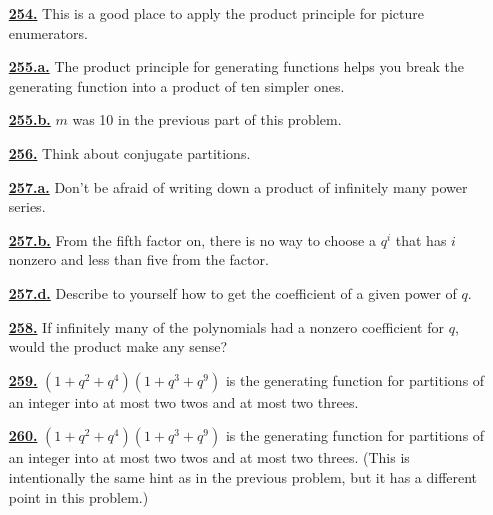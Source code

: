 \documentclass[10pt,]{book}
\theoremstyle{plain}
\theoremstyle{definition}
\theoremstyle{definition}
\theoremstyle{definition}
\numberwithin{equation}{chapter}
\begin{document}
\begin{itemize}[itemsep=1em]
\hypertarget{a-254}{}\item[\textbf{\hyperref[change-making]{254.}}]
\hypertarget{p-1154}{}%
This is a good place to apply the product principle for picture enumerators.%

\hypertarget{a-255.a}{}\item[\textbf{\hyperref[task-200]{255.a.}}]
\hypertarget{p-1160}{}%
The product principle for generating functions helps you break the generating function into a product of ten simpler ones.%

\hypertarget{a-255.b}{}\item[\textbf{\hyperref[largestpartatmostm]{255.b.}}]
\hypertarget{p-1163}{}%
\(m\) was 10 in the previous part of this problem.%

\hypertarget{a-256}{}\item[\textbf{\hyperref[atmostmparts]{256.}}]
\hypertarget{p-1166}{}%
Think about conjugate partitions.%

\hypertarget{a-257.a}{}\item[\textbf{\hyperref[task-202]{257.a.}}]
\hypertarget{p-1170}{}%
Don't be afraid of writing down a product of infinitely many power series.%

\hypertarget{a-257.b}{}\item[\textbf{\hyperref[task-203]{257.b.}}]
\hypertarget{p-1173}{}%
From the fifth factor on, there is no way to choose a \(q^i\) that has \(i\) nonzero and less than five from the factor.%

\hypertarget{a-257.d}{}\item[\textbf{\hyperref[task-205]{257.d.}}]
\hypertarget{p-1178}{}%
Describe to yourself how to get the coefficient of a given power of \(q\).%

\hypertarget{a-258}{}\item[\textbf{\hyperref[activity-258]{258.}}]
\hypertarget{p-1184}{}%
If infinitely many of the polynomials had a nonzero coefficient for \(q\), would the product make any sense?%

\hypertarget{a-259}{}\item[\textbf{\hyperref[activity-259]{259.}}]
\hypertarget{p-1187}{}%
\((1 + q^2 + q^4 )(1 + q^3 + q^9 )\) is the generating function for partitions of an integer into at most two twos and at most two threes.%

\hypertarget{a-260}{}\item[\textbf{\hyperref[activity-260]{260.}}]
\hypertarget{p-1190}{}%
\((1 + q^2 + q^4 )(1 + q^3 + q^9 )\) is the generating function for partitions of an integer into at most two twos and at most two threes. (This is intentionally the same hint as in the previous problem, but it has a different point in this problem.)%


\end{itemize}
\end{document}
